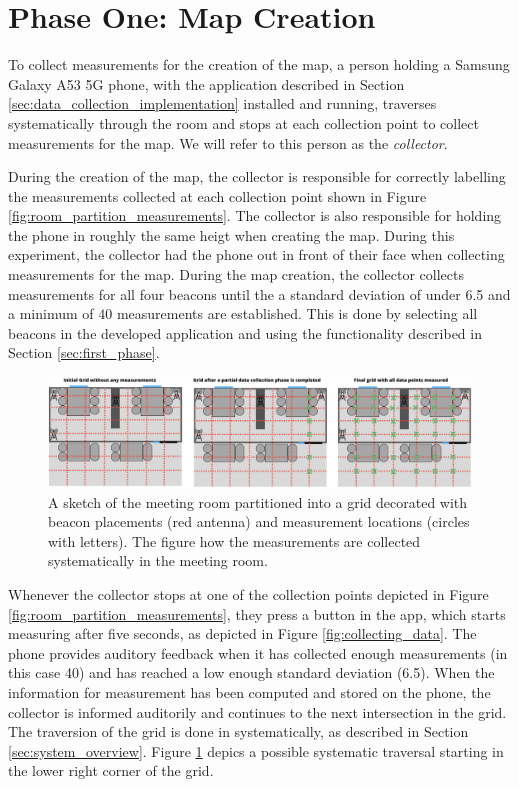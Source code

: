 \section{Phase One: Map Creation}\label{sec:eval_phase1}
To collect measurements for the creation of the map, a person holding a Samsung Galaxy A53 5G phone, with the application described in Section \ref{sec:data_collection_implementation} installed and running, traverses systematically through the room and stops at each collection point to collect measurements for the map. 
We will refer to this person as the \textit{collector}.

During the creation of the map, the collector is responsible for correctly labelling the measurements collected at each collection point shown in Figure \ref{fig:room_partition_measurements}. 
The collector is also responsible for holding the phone in roughly the same heigt when creating the map. 
During this experiment, the collector had the phone out in front of their face when collecting measurements for the map. 
During the map creation, the collector collects measurements for all four beacons until the a standard deviation of under 6.5  and a minimum of $40$ measurements are established.
This is done by selecting all beacons in the developed application and using the functionality described in Section \ref{sec:first_phase}.

\begin{figure}[h]
    \centering
    \includegraphics[width=\textwidth]{images/experiment_map_creation.png}
    \caption{A sketch of the meeting room partitioned into a grid decorated with beacon placements (red antenna) and measurement locations (circles with letters). The figure how the measurements are collected systematically in the meeting room.}
    \label{fig:experiment_map_creation}
\end{figure}
Whenever the collector stops at one of the collection points depicted in Figure \ref{fig:room_partition_measurements}, they press a button in the app, which starts measuring after five seconds, as depicted in Figure \ref{fig:collecting_data}.
The phone provides auditory feedback when it has collected enough measurements (in this case 40) and has reached a low enough standard deviation (6.5).
When the information for measurement has been computed and stored on the phone, the collector is informed auditorily and continues to the next intersection in the grid. 
The traversion of the grid is done in systematically, as described in Section \ref{sec:system_overview}. 
Figure \ref{fig:experiment_map_creation} depics a possible systematic traversal starting in the lower right corner of the grid. 


